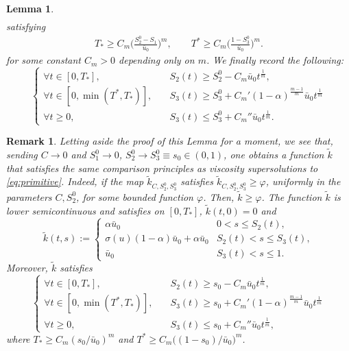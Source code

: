 \documentclass[11pt]{article}
\newtheorem{lemma}[thm]{Lemma}
\newtheorem{remark}[thm]{Remark}
\numberwithin{equation}{section} %
\newcommand{\al}{\alpha}
\begin{document}
\begin{lemma}
\begin{align*}
    \end{align*}
    satisfying
    \begin{align*}
        T_* \ge C_m\bigg(\frac{S_2^0-S_1}{\bar u_0}\bigg)^m, \qquad
        T^* \ge C_m\bigg(\frac{1-S_3^0}{\bar u_0}\bigg)^m .
    \end{align*}
    for some constant $C_m>0$ depending only on $m$. 
    We finally record the following:
    \begin{equation*}
    \begin{cases}
      \forall t\in [0,T_*], &\quad S_2(t) \ge  S_2^0 - C_m\bar u_0 t^\frac{1}{m} , \\
      \forall t\in [0,\min(T^*,T_*)],&\quad  S_3(t) \ge S_3^0 + C_m' (1-\al)^{\frac{m-1}{m}} \bar u_0 t^\frac{1}{m}  \\
     \forall t\ge 0, &\quad S_3(t) \le S_3^0 + C_m'' \bar u_0 t^\frac{1}{m}.
    \end{cases}
    \end{equation*}
    
\end{lemma}
\begin{remark}\label{cor:twovortexcomparison}
Letting aside the proof of this Lemma for a moment, we see that, sending $C\to 0$ and $S_1^0\to 0$, $S_2^0\to S_3^0\equiv s_0\in (0,1)$, one obtains a function $\tilde k$ that satisfies the same comparison principles as viscosity supersolutions to \eqref{eq:primitive}. Indeed, if the map $\tilde k_{C,S^0_2,S_3^0}$ satisfies $\tilde k_{C,S^0_2,S_3^0} \ge \varphi$, uniformly in the parameters $C, S_2^0$, for some bounded function $\varphi$. Then, $\tilde k \ge \varphi$. The function $\tilde k$ is lower semicontinuous and satisfies on $[0,T_*]$, $\tilde k(t,0)= 0$ and
\begin{equation*}
    \tilde k (t,s) := \begin{cases}
        \al \bar u_0 & 0< s \le S_2(t), \\
        \sigma(u) (1-\al )\bar u_0 + \al \bar u_0 & S_2(t) < s \le S_3(t), \\
    \bar u_0  & S_3(t) < s \le 1.
    \end{cases}
\end{equation*}
Moreover, $\tilde k$ satisfies 
\begin{equation}\label{eq:fronttrackings}
    \begin{cases}
      \forall t\in [0,T_*], &\quad S_2(t) \ge  s_0 - C_m\bar u_0 t^\frac{1}{m} , \\
      \forall t\in [0,\min(T^*,T_*)],&\quad  S_3(t) \ge s_0 + C_m' (1-\al)^{\frac{m-1}{m}} \bar u_0 t^\frac{1}{m}  \\
     \forall t\ge 0, &\quad S_3(t) \le s_0 + C_m'' \bar u_0 t^\frac{1}{m},
    \end{cases}
    \end{equation}
where $T_* \ge C_m (s_0/\bar u_0)^m$ and $T^* \ge C_m \big((1-s_0 )/ \bar u_0\big)^m$.
\end{remark}
\end{document}
